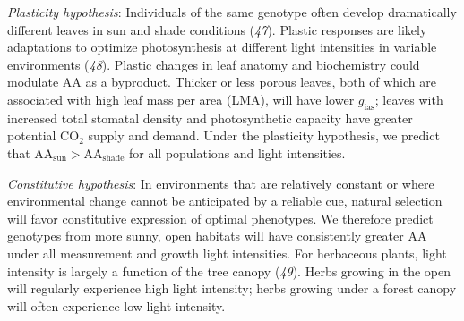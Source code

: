 \documentclass[
  letterpaper,
  DIV=11,
  numbers=noendperiod]{scrartcl}
\newcommand{\aashade}{\mathrm{AA}_{\text{shade}}}
\newcommand{\aasun}{\mathrm{AA}_{\text{sun}}}
\newcommand{\aax}{$\mathrm{AA}$}
\newcommand{\gias}{$g_\text{ias}$}
\begin{document}
\emph{Plasticity hypothesis}: Individuals of the same genotype often
develop dramatically different leaves in sun and shade conditions
(\emph{47}). Plastic responses are likely adaptations to optimize
photosynthesis at different light intensities in variable environments
(\emph{48}). Plastic changes in leaf anatomy and biochemistry could
modulate \aax{} as a byproduct. Thicker or less porous leaves, both of
which are associated with high leaf mass per area (LMA), will have lower
\gias; leaves with increased total stomatal density and photosynthetic
capacity have greater potential CO\(_2\) supply and demand. Under the
plasticity hypothesis, we predict that \(\aasun{} > \aashade{}\) for all
populations and light intensities.

\emph{Constitutive hypothesis}: In environments that are relatively
constant or where environmental change cannot be anticipated by a
reliable cue, natural selection will favor constitutive expression of
optimal phenotypes. We therefore predict genotypes from more sunny, open
habitats will have consistently greater \aax{} under all measurement and
growth light intensities. For herbaceous plants, light intensity is
largely a function of the tree canopy (\emph{49}). Herbs growing in the
open will regularly experience high light intensity; herbs growing under
a forest canopy will often experience low light intensity.
\end{document}
